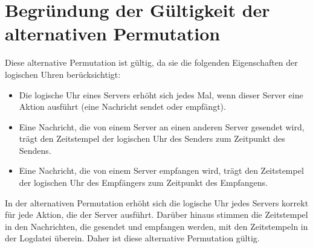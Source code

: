 \documentclass{article}
\begin{document}
\section*{Begründung der Gültigkeit der alternativen Permutation}

Diese alternative Permutation ist gültig, da sie die folgenden Eigenschaften der logischen Uhren berücksichtigt:

\begin{itemize}
  \item Die logische Uhr eines Servers erhöht sich jedes Mal, wenn dieser Server eine Aktion ausführt (eine Nachricht sendet oder empfängt).
  \item Eine Nachricht, die von einem Server an einen anderen Server gesendet wird, trägt den Zeitstempel der logischen Uhr des Senders zum Zeitpunkt des Sendens.
  \item Eine Nachricht, die von einem
Server empfangen wird, trägt den Zeitstempel der logischen Uhr des Empfängers zum Zeitpunkt des Empfangens.
\end{itemize}

In der alternativen Permutation erhöht sich die logische Uhr jedes Servers korrekt für jede Aktion, die der Server ausführt. Darüber hinaus stimmen die Zeitstempel in den Nachrichten, die gesendet und empfangen werden, mit den Zeitstempeln in der Logdatei überein. Daher ist diese alternative Permutation gültig.
\end{document}
